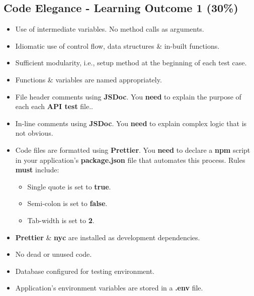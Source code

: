 \documentclass{article}
\begin{document}
\subsection*{Code Elegance - Learning Outcome 1 (30\%)}
\begin{itemize}
    \item Use of intermediate variables. No method calls as arguments.
    \item Idiomatic use of control flow, data structures \& in-built functions.
    \item Sufficient modularity, i.e., setup method at the beginning of each test case.
    \item Functions \& variables are named appropriately.
    \item File header comments using \textbf{JSDoc}. You \textbf{need} to explain the purpose of each each \textbf{API test} file..
    \item In-line comments using \textbf{JSDoc}. You \textbf{need} to explain complex logic that is not obvious.
    \item Code files are formatted using \textbf{Prettier}. You \textbf{need} to declare a \textbf{npm} script in your application's \textbf{package.json} file that automates this process. Rules \textbf{must} include:
          \begin{itemize}
            \item Single quote is set to \textbf{true}.
            \item Semi-colon is set to \textbf{false}.
            \item Tab-width is set to \textbf{2}.
          \end{itemize}
    \item \textbf{Prettier} \& \textbf{nyc} are installed as development dependencies.
    \item No dead or unused code.
    \item Database configured for testing environment.
    \item Application's environment variables are stored in a \textbf{.env} file.
\end{itemize}
\end{document}
